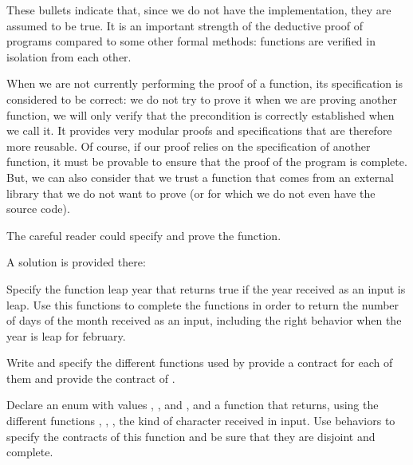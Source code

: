 

These bullets indicate that, since we do not have the implementation,
they are assumed to be true. It is an important strength of the
deductive proof of programs compared to some other formal methods:
functions are verified in isolation from each other.

When we are not currently performing the proof of a function, its
specification is considered to be correct: we do not try to prove it
when we are proving another function, we will only verify that the
precondition is correctly established when we call it. It provides very
modular proofs and specifications that are therefore more reusable. Of
course, if our proof relies on the specification of another function, it
must be provable to ensure that the proof of the program is complete.
But, we can also consider that we trust a function that comes from an
external library that we do not want to prove (or for which we do not
even have the source code).

The careful reader could specify and prove the 
function.

A solution is provided there:








\label{l4:contract-modularity-ex-days-of-month}


Specify the function leap year that returns true if the year received
as an input is leap. Use this functions to complete the functions
 in order to return the number of days of the
month received as an input, including the right behavior when the year
is leap for february.





\label{l4:contract-modularity-ex-alpha-num}


Write and specify the different functions used by
 provide a contract for each of them and
provide the contract of .





Declare an enum with values , ,
 and , and a function
 that returns, using the different
functions , ,
, the kind of character received in input. Use
behaviors to specify the contracts of this function and be sure that
they are disjoint and complete.




